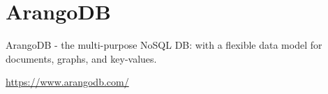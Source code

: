 \chapter{ArangoDB}
\label{chap:ArangoDB}

ArangoDB - the multi-purpose NoSQL DB:
with a flexible data model for documents, graphs, and key-values.

\url{https://www.arangodb.com/}

